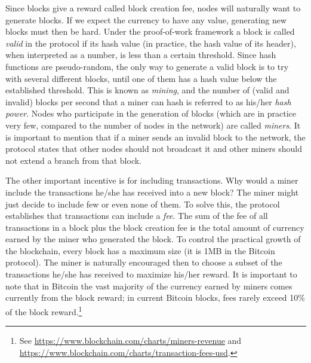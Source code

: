 Since blocks give a reward called block creation fee, nodes will naturally want to generate blocks. If we expect the currency to have any value, generating new blocks must then be hard. Under the proof-of-work framework a block is called \emph{valid} in the protocol if its hash value (in practice, the hash value of its header), when interpreted as a number, is less than a certain threshold. Since hash functions are pseudo-random, the only way to generate a valid block is to try with several different blocks, until one of them has a hash value below the established threshold. This is known as \emph{mining}, and the number of (valid and invalid) blocks per second that a miner can hash is referred to as his/her \emph{hash power}. Nodes who participate in the generation of blocks (which are in practice very few, compared to the number of nodes in the network) are called \emph{miners}. It is important to mention that if a miner sends an invalid block to the network, the protocol states that other nodes should not broadcast it and other miners should not extend a branch from that block. 

\iffalse
Assume now that a miner generates a new valid block that points to the last block of the current blockchain. He/she will try to get this new block broadcast across the network as fast as possible, because this makes the branch of such block longer, encouraging other nodes to mine on top of this new block. If he/she keeps this block private, most likely other miners will generate a longer branch without his/her node, and the miner will not be able to place his/her block in the blockchain, missing the associated reward.
\fi

The other important incentive is for including transactions. Why would a miner include the transactions he/she has received into a new block? The miner might just decide to include few or even none of them. To solve this, the protocol establishes that transactions can include a \emph{fee}. The sum of the fee of all transactions in a block plus the block creation fee is the total amount of currency earned by the miner who generated the block. To control the practical growth of the blockchain, every block has a maximum size (it is 1MB in the Bitcoin protocol). The miner is naturally encouraged then to choose a subset of the transactions he/she has received to maximize his/her reward. It is important to note that in Bitcoin the vast majority of the currency earned by miners comes currently from the block reward; in current Bitcoin blocks, fees rarely exceed 10\% of the block reward.\footnote{See  \url{https://www.blockchain.com/charts/miners-revenue} and \url{https://www.blockchain.com/charts/transaction-fees-usd}.}


